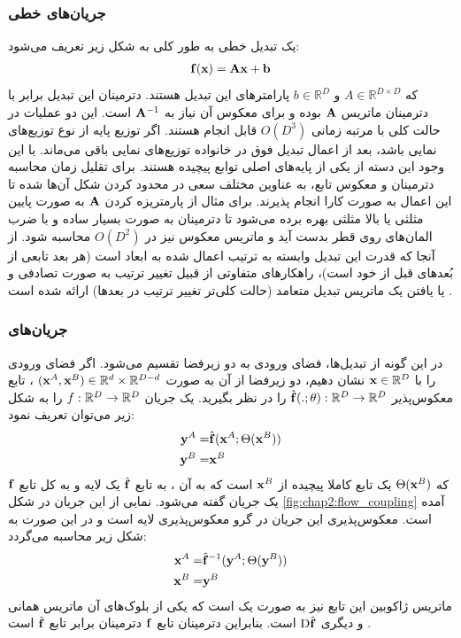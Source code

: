 \subsubsection{جریان‌های خطی}
یک تبدیل خطی به طور کلی به شکل زیر تعریف می‌شود:
\begin{align}
	{\bf f}({\bf x}) = {\bf A}{\bf x} + {\bf b}
\end{align}
که $A \in \mathbb{R}^{D \times D}$ و $b \in \mathbb{R}^D$ پارامتر‌های این تبدیل هستند. دترمینان این تبدیل برابر با دترمینان ماتریس ${\bf A}$ بوده و برای معکوس آن نیاز به ${\bf A}^{-1}$ است.
این دو عملیات در حالت کلی با مرتبه زمانی
$O(D^3)$
قابل انجام هستند. اگر توزیع پایه از نوع توزیع‌های نمایی باشد، بعد از اعمال تبدیل فوق در خانواده توزیع‌های نمایی باقی می‌ماند. با این وجود این دسته از یکی از پایه‌های اصلی توابع پیچیده هستند. برای تقلیل زمان محاسبه دترمینان و معکوس تابع، به عناوین مختلف سعی در محدود کردن شکل آن‌ها شده تا این اعمال به صورت کارا انجام پذیرند. برای مثال از پارمتریزه کردن ${\bf A}$ به صورت پایین مثلثی یا بالا مثلثی بهره برده می‌شود تا دترمینان به صورت بسیار ساده و با ضرب المان‌های روی قطر بدست آید و ماتریس معکوس نیز در $O(D^2)$ محاسبه شود. از آنجا که قدرت این تبدیل وابسته به ترتیب اعمال شده به ابعاد است (هر بعد تابعی از بُعدهای قبل از خود است)، راهکارهای متفاوتی از قبیل تغییر ترتیب به صورت تصادفی و یا یافتن یک ماتریس تبدیل متعامد (حالت کلی‌تر تغییر ترتیب در بعدها) ارائه شده است \cite{flow_survey, glow}.
\subsubsection{جریان‌های
}
در این گونه از تبدیل‌ها، فضای ورودی به دو زیرفضا تقسیم می‌شود. اگر فضای ورودی را با
${\bf x} \in {\mathbb{R}}^D$
نشان دهیم، دو زیرفضا از آن به صورت
$({\bf x}^A, {\bf x}^B) \in {\mathbb{R}}^d \times {\mathbb{R}}^{D - d}$
، تابع معکوس‌پذیر
$\hat{{\bf f}}(.; \theta) : {\mathbb{R}}^D \rightarrow {\mathbb{R}}^D$
را در نظر بگیرید. یک جریان \coupling{}
$f : {\mathbb{R}}^D \rightarrow {\mathbb{R}}^D$
را به شکل زیر می‌توان تعریف نمود:
\begin{align}
	{\bf y}^A = & \hat{{\bf f}} ({\bf x}^A; \Theta({\bf x}^B))
	\nonumber
	\\
	{\bf y}^B = & {\bf x}^B
\end{align}
که $\Theta({\bf x}^B)$ یک تابع کاملا پیچیده از ${\bf x}^B$ است که به آن
، به تابع $\hat{{\bf f}}$ یک لایه \coupling{} و به کل تابع ${\bf f}$ یک جریان \coupling{} گفته می‌شود. نمایی از این جریان در شکل \ref{fig:chap2:flow_coupling} آمده است. معکوس‌پذیری این جریان در گرو معکوس‌پذیری لایه \coupling{} است و در این صورت به شکل زیر محاسبه می‌گردد:
\begin{align}
	{\bf x}^A = & \hat{{\bf f}}^{-1} ({\bf y}^A; \Theta({\bf y}^B))
	\nonumber
	\\
	{\bf x}^B = & {\bf y}^B
\end{align}
ماتریس ژاکوبین این تابع نیز به صورت یک
است که یکی از بلوک‌های آن ماتریس همانی و دیگری $\text{D}\hat{{\bf f}}$ است. بنابراین دترمینان  تابع ${\bf f}$ دترمینان برابر تابع $\hat{{\bf f}}$ است \cite{flow_survey, realnvp, glow}.

